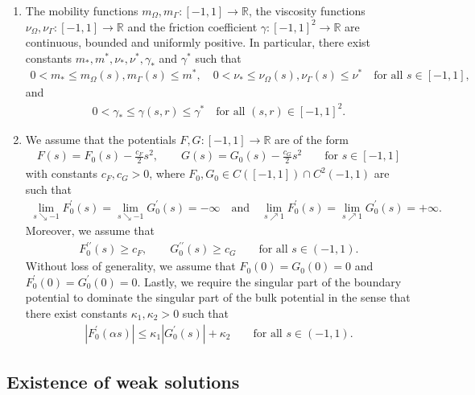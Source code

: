 \documentclass[11pt,reqno]{amsart}
\theoremstyle{remark}
\numberwithin{equation}{section}
\newcommand{\abs}[1]{|#1|}
\newcommand{\R}{\mathbb R}
\newcommand{\Om}{\Omega}
\newcommand{\Ga}{\Gamma}
\begin{document}
\begin{enumerate}[label=\textnormal{\bfseries(A\arabic*)}]
    \item \label{Assumption:NSCH:Coefficients} The mobility functions $m_\Om,m_\Ga:[-1,1]\rightarrow\R$, the viscosity functions $\nu_\Om, \nu_\Ga:[-1,1]\rightarrow\R$ and the friction coefficient $\gamma:[-1,1]^2\rightarrow\R$ are continuous, bounded and uniformly positive. In particular, there exist constants $m_\ast, m^\ast, \nu_\ast, \nu^\ast, \gamma_\ast$ and $\gamma^\ast$ such that
    \begin{align*}
    	0 < m_\ast \leq m_\Om(s), m_\Ga(s) \leq m^\ast, \quad 0 < \nu_\ast \leq \nu_\Om(s), \nu_\Ga(s) \leq \nu^\ast \quad\text{for all~}s\in[-1,1],
    \end{align*}
    and
    \begin{align*}
    	0 < \gamma_\ast \leq \gamma(s,r) \leq \gamma^\ast \quad\text{for all~}(s,r)\in[-1,1]^2.
    \end{align*}
	\item \label{Assumption:NSCH:Potentials} We assume that the potentials $F,G:[-1,1]\rightarrow\R$ are of the form
	\begin{align*}
		F(s) = F_0(s) - \frac{c_F}{2}s^2, \qquad G(s) = G_0(s) - \frac{c_G}{2}s^2 \qquad\text{for~}s\in[-1,1]
	\end{align*}
	with constants $c_F,c_G > 0$, where $F_0, G_0\in C([-1,1])\cap C^2(-1,1)$ are such that
    \begin{align*}
        \lim_{s\searrow -1} F_0^\prime(s) = \lim_{s\searrow -1} G_0^\prime(s) = - \infty \quad\text{and}\quad \lim_{s\nearrow 1} F_0^\prime(s) = \lim_{s\nearrow 1} G_0^\prime(s) = + \infty.
    \end{align*}
    Moreover, we assume that
    \begin{align*}
        F_0^{\prime\prime}(s) \geq c_F, \qquad G_0^{\prime\prime}(s) \geq c_G \qquad\text{for all~}s\in(-1,1).
    \end{align*}
    Without loss of generality, we assume that $F_0(0) = G_0(0) = 0$ and $F_0^\prime(0) = G_0^\prime(0) = 0$. Lastly, we require the singular part of the boundary potential to dominate the singular part of the bulk potential in the sense that there exist constants $\kappa_1, \kappa_2 > 0$ such that
    \begin{align}\label{Assumption:NSCH:DominationProperty}
        \abs{F_0^\prime(\alpha s)} \leq \kappa_1\abs{G_0^\prime(s)} + \kappa_2 \qquad\text{for all~}s\in(-1,1).
    \end{align}
\end{enumerate}

\subsection{Existence of weak solutions}
\end{document}
